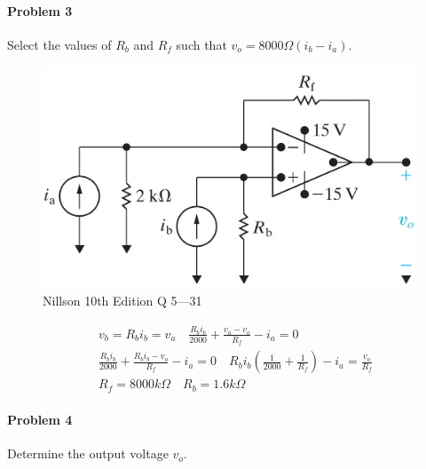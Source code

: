 \paragraph{Problem 3}
Select the values of $R_b$ and $R_f$ such that $v_o = 8000 \Omega(i_b- i_a)$.
\begin{figure}[H]
	\centering
	\includegraphics[width=1\linewidth]{images/P3Nillson10thQ5_31.png}
	\caption{Nillson 10th Edition Q 5---31}
	\label{fig:p3nillson10thq531}
\end{figure}
\begin{align*}
& v_b=R_bi_b=v_a \quad  \frac{R_bi_b}{2000}+\frac{v_a-v_o}{R_f}-i_a=0 \\
& \frac{R_bi_b}{2000}+\frac{R_bi_b-v_o}{R_f}-i_a=0 \quad R_bi_b \left(\frac{1}{2000}+\frac{1}{R_f}\right)-i_a=\frac{v_o}{R_f} \\
& R_f = 8000 k \Omega \quad R_b=1.6 k \Omega 
\end{align*}
\paragraph{Problem 4}
Determine the output voltage $v_o$.

